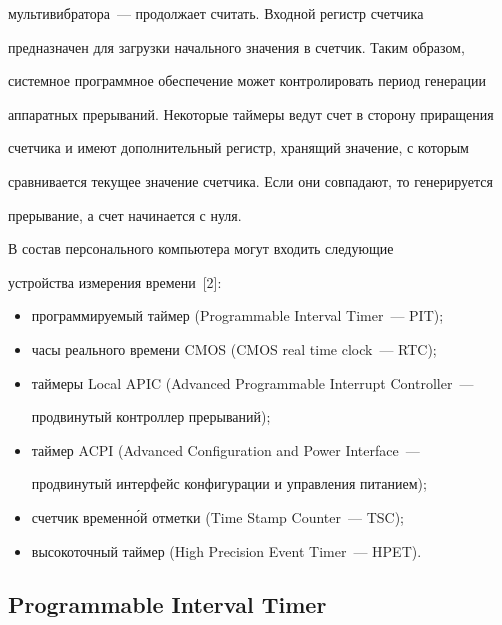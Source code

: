 мультивибратора~--- продолжает считать. Входной регистр счетчика 


предназначен для загрузки начального значения в счетчик. Таким образом, 


системное программное обеспечение может контролировать период генерации 


аппаратных прерываний. Некоторые таймеры ведут счет в сторону приращения 


счетчика и имеют дополнительный регистр, хранящий значение, с которым 


сравнивается текущее значение счетчика. Если они совпадают, то генерируется 


прерывание, а счет начинается с нуля.


     


     В состав персонального компьютера могут входить следующие 


устройства измерения времени~[2]:


     \begin{itemize} %


\item программируемый таймер (Programmable Interval Timer~--- PIT);


\item часы реального времени CMOS (CMOS real time clock~--- RTC);


\item таймеры Local APIC (Advanced Programmable Interrupt Controller~--- 


продвинутый контроллер прерываний);


\item таймер ACPI (Advanced Configuration and Power Interface~--- 


продвинутый интерфейс конфигурации и управления питанием);


\item счетчик временн\'{о}й отметки (Time Stamp Counter~--- TSC);


\item высокоточный таймер (High Precision Event Timer~--- HPET).


\end{itemize}





\subsection{Programmable Interval Timer } %


